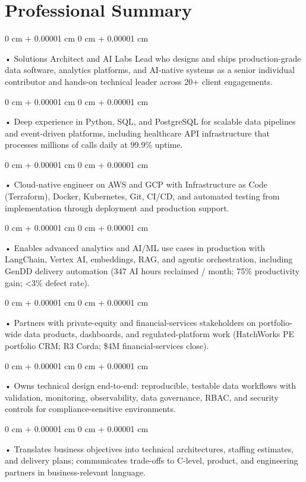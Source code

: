 \documentclass[10pt, letterpaper]{article}
\newenvironment{onecolentry}{
    \begin{adjustwidth}{
        0 cm + 0.00001 cm
    }{
        0 cm + 0.00001 cm
    }
}{
    \end{adjustwidth}
} %
\begin{document}
    \section{Professional Summary}
        \vspace{2 pt }
        \begin{onecolentry}
            • Solutions Architect and AI Labs Lead who designs and ships production-grade data software, analytics platforms, and AI-native systems as a senior individual contributor and hands-on technical leader across 20+ client engagements.
        \end{onecolentry}
        \begin{onecolentry}
            • Deep experience in Python, SQL, and PostgreSQL for scalable data pipelines and event-driven platforms, including healthcare API infrastructure that processes millions of calls daily at 99.9\% uptime.
        \end{onecolentry}
        \begin{onecolentry}
            • Cloud-native engineer on AWS and GCP with Infrastructure as Code (Terraform), Docker, Kubernetes, Git, CI/CD, and automated testing from implementation through deployment and production support.
        \end{onecolentry}
        \begin{onecolentry}
            • Enables advanced analytics and AI/ML use cases in production with LangChain, Vertex AI, embeddings, RAG, and agentic orchestration, including GenDD delivery automation (347 AI hours reclaimed / month; 75\% productivity gain; \textless3\% defect rate).
        \end{onecolentry}
        \begin{onecolentry}
            • Partners with private-equity and financial-services stakeholders on portfolio-wide data products, dashboards, and regulated-platform work (HatchWorks PE portfolio CRM; R3 Corda; \$4M financial-services close).
        \end{onecolentry}
        \begin{onecolentry}
            • Owns technical design end-to-end: reproducible, testable data workflows with validation, monitoring, observability, data governance, RBAC, and security controls for compliance-sensitive environments.
        \end{onecolentry}
        \begin{onecolentry}
            • Translates business objectives into technical architectures, staffing estimates, and delivery plans; communicates trade-offs to C-level, product, and engineering partners in business-relevant language.
        \end{onecolentry}
\end{document}
